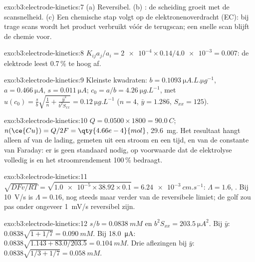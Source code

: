 \begin{solution}{exo:b3:electrode-kinetics:7}
(a) Reversibel. (b) : de scheiding groeit met de
scansnelheid. (c) Een chemische stap volgt op de elektronenoverdracht
(EC): bij trage scans wordt het product verbruikt vóór de terugscan; een
snelle scan blijft de chemie voor.
\end{solution}

\begin{solution}{exo:b3:electrode-kinetics:8}
$K_{ij}a_j/a_i = \num{2e-4} \times 0.14/\num{4.0e-3} = 0.007$: de elektrode leest 0.7\,\% te hoog af.
\end{solution}

\begin{solution}{exo:b3:electrode-kinetics:9}
Kleinste kwadraten: $b = \qty{0.1093}{\micro A.L.\micro g^{-1}}$, $a = \qty{0.466}{\micro A}$, $s = \qty{0.011}{\micro A}$; $c_0 = a/b =
\qty{4.26}{\micro g.L^{-1}}$, met $u(c_0) = \frac sb\sqrt{\frac1n + \frac{\bar y^2}{b^2S_{xx}}} = \qty{0.12}{\micro g.L^{-1}}$
($n = 4$, $\bar y = 1.286$, $S_{xx} = 125$).
\end{solution}

\begin{solution}{exo:b3:electrode-kinetics:10}
$Q = 0.0500 \times 1800 = \qty{90.0}{C}$; $n(\ce{Cu}) = Q/2F = \qty{4.66e-4}{mol}$, \qty{29.6}{mg}. Het
resultaat hangt alleen af van de lading, gemeten uit een stroom en een
tijd, en van de constante van Faraday: er is geen standaard nodig, op
voorwaarde dat de elektrolyse volledig is en het stroomrendement
100\,\% bedraagt.
\end{solution}

\begin{solution}{exo:b3:electrode-kinetics:11}
$\sqrt{DFv/RT} = \sqrt{\num{1.0e-5} \times 38.92 \times 0.1} = \qty{6.24e-3}{cm.s^{-1}}$: $\Lambda = 1.6$, .
Bij \qty{10}{V/s} is $\Lambda = 0.16$, nog steeds  maar
verder van de reversibele limiet; de golf zou pas onder ongeveer
\qty{1}{mV/s} reversibel zijn.
\end{solution}

\begin{solution}{exo:b3:electrode-kinetics:12}
$s/b = \qty{0.0838}{mM}$ en $b^2S_{xx} = \qty{203.5}{\micro A^2}$. Bij $\bar y$: $0.0838\sqrt{1 + 1/7} = \qty{0.090}{mM}$.
Bij \qty{18.0}{\micro A}: $0.0838\sqrt{1.143 + 83.0/203.5} = \qty{0.104}{mM}$. Drie aflezingen bij $\bar y$:
$0.0838\sqrt{1/3 + 1/7} = \qty{0.058}{mM}$.
\end{solution}

